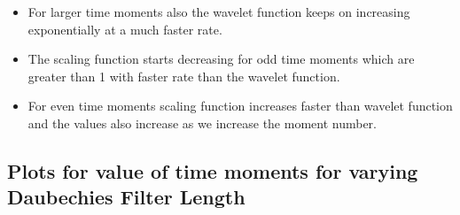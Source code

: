 \documentclass{article}
\begin{document}
\begin{itemize}
\item For larger time moments also the wavelet function keeps on increasing exponentially at a much faster rate.
\item The scaling function starts decreasing for odd time moments which are greater than 1 with faster rate than the wavelet function.
\item For even time moments scaling function increases faster than wavelet function and the values also increase as we increase the moment number.

\end{itemize}

\subsection{Plots for value of time moments for varying Daubechies Filter Length}

\begin{figure}[H]
    \centering
    \qquad
    \label{fig:example}%
\end{figure}
\end{document}
